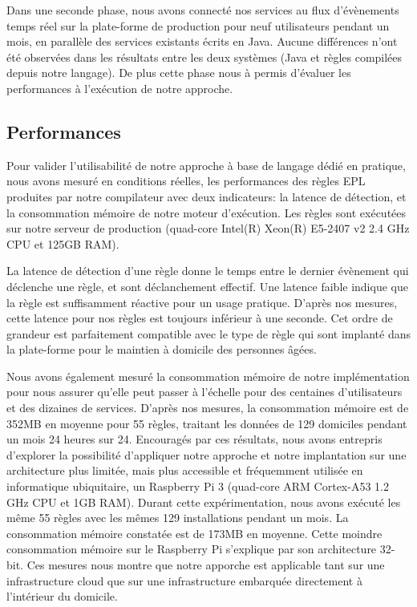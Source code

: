 Dans une seconde phase, nous avons connecté nos services au flux d'évènements temps réel sur la plate-forme de production pour neuf utilisateurs pendant un mois, en parallèle des services existants écrits en Java. Aucune différences n'ont été observées dans les résultats entre les deux systèmes (Java et règles compilées depuis notre langage). De plus cette phase nous à permis d'évaluer les performances à l'exécution de notre approche.


\subsection{Performances}\label{validation:performance}
Pour valider l'utilisabilité de notre approche à base de langage dédié en pratique, nous avons mesuré en conditions réelles, les performances des règles EPL produites par notre compilateur avec deux indicateurs: la latence de détection, et la consommation mémoire de notre moteur d'exécution. Les règles sont exécutées sur notre serveur de production (quad-core Intel(R) Xeon(R) E5-2407 v2 2.4 GHz CPU et 125GB RAM).

La latence de détection d'une règle donne le temps entre le dernier évènement qui déclenche une règle, et sont déclanchement effectif. Une latence faible indique que la règle est suffisamment réactive pour un usage pratique. D'après nos mesures, cette latence pour nos règles est toujours inférieur à une seconde. Cet ordre de grandeur est parfaitement compatible avec le type de règle qui sont implanté dans la plate-forme pour le maintien à domicile des personnes âgées.

Nous avons également mesuré la consommation mémoire de notre implémentation pour nous assurer qu'elle peut passer à l'échelle pour des centaines d'utilisateurs et des dizaines de services. D'après nos mesures, la consommation mémoire est de 352MB en moyenne pour 55 règles, traitant les données de 129 domiciles pendant un mois 24 heures sur 24. Encouragés par ces résultats, nous avons entrepris d'explorer la possibilité d'appliquer notre approche et notre implantation sur une architecture plus limitée, mais plus accessible et fréquemment utilisée en informatique ubiquitaire, un Raspberry Pi 3 (quad-core ARM Cortex-A53 1.2 GHz CPU et 1GB RAM). Durant cette expérimentation, nous avons exécuté les même 55 règles avec les mêmes 129 installations pendant un mois. La consommation mémoire constatée est de 173MB en moyenne. Cette moindre consommation mémoire sur le Raspberry Pi s'explique par son architecture 32-bit.
Ces mesures nous montre que notre apporche est applicable tant sur une infrastructure cloud que sur une infrastructure embarquée directement à l'intérieur du domicile.

